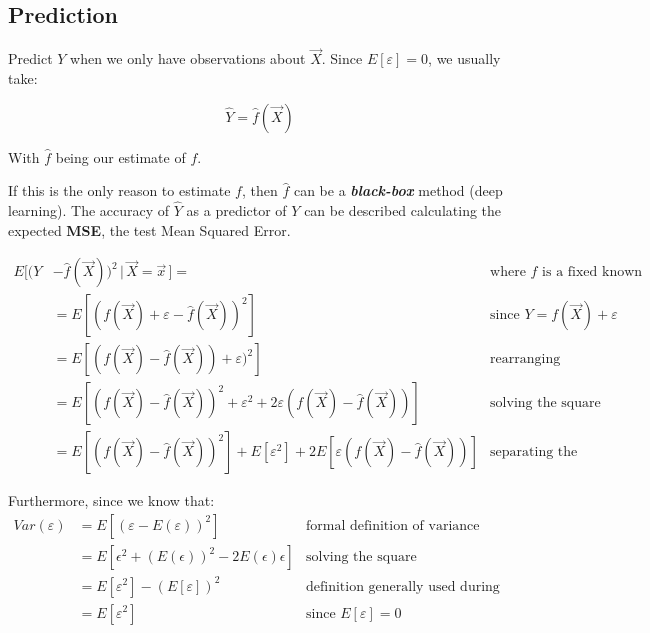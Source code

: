    \subsection{Prediction}
      Predict $Y$ when we only have observations about $\vec{X}$. Since
      $E[\varepsilon] = 0$, we usually take:

      $$\hat{Y} = \hat{f} (\vec{X})$$

      With $\hat{f}$ being our estimate of $f$.
      
      If this is the only reason to estimate $f$, then $\hat{f}$ can be a
      \textit{\textbf{black-box}} method (deep learning). The accuracy of
      $\hat{Y}$ as a predictor of $Y$ can be described calculating the expected
      \textbf{MSE}, the test Mean Squared Error. %

      \begin{align*}
        E[(Y&-\hat{f}(\vec{X}))^2 \,|\, \vec{X} = \vec{x}\,] = 
        & \text{where } \hat{f} \text{ is a fixed known function}\\
        & = E[(f(\vec{X}) + \varepsilon - \hat{f}(\vec{X}))^2]
        & \text{since } Y = f(\vec{X}) + \varepsilon \\
        & = E[(f(\vec{X}) - \hat{f}(\vec{X})) + \varepsilon)^2]
        & \text{rearranging} \\
        & = E[(f(\vec{X}) - \hat{f}(\vec{X}))^2 + \varepsilon^2 + 2\varepsilon(f(\vec{X}) - \hat{f}(\vec{X}))]
        & \text{solving the square} \\
        & = E[(f(\vec{X}) - \hat{f}(\vec{X}))^2] + E[\varepsilon^2] + 2E[\varepsilon(f(\vec{X}) - \hat{f}(\vec{X}))]
        & \text{separating the expectations}
      \end{align*}
      
      Furthermore, since we know that:
      \begin{align*}
        Var(\varepsilon) 
        & = E[(\varepsilon - E(\varepsilon))^2]
        & \text{formal definition of variance} \\
        & = E[\epsilon^2 + (E(\epsilon))^2 - 2E(\epsilon)\epsilon]
        & \text{solving the square} \\
        & = E[\varepsilon^2] - (E[\varepsilon])^2  %
        & \text{definition generally used during calculation} \\
        & = E[\varepsilon^2] 
        & \text{since } E[\varepsilon] = 0 \\
      \end{align*}

